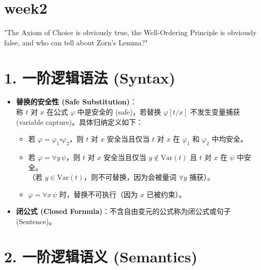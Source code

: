\documentclass[12pt, a4paper]{article}
\begin{document}
\section*{week2}
\raggedright{"The Axiom of Choice is obviously true, the Well-Ordering Principle is obviously false, and who can tell about Zorn's Lemma?"} \\

\raggedright{}
\section*{1. 一阶逻辑语法 (Syntax)}

\begin{itemize}
    \item \textbf{替换的安全性 (Safe Substitution)}：\\
    称 \(t\) 对 \(x\) 在公式 \(\varphi\) 中是安全的 (safe)，若替换 \(\varphi[t/x]\) 不发生变量捕获 (variable capture)。具体归纳定义如下：
    \begin{itemize}
        \item 若 \(\varphi = \varphi_1 \square \varphi_2\)，则 \(t\) 对 \(x\) 安全当且仅当 \(t\) 对 \(x\) 在 \(\varphi_1\) 和 \(\varphi_2\) 中均安全。
        \item 若 \(\varphi = \forall y \, \psi\)，则 \(t\) 对 \(x\) 安全当且仅当 \(y \notin \text{Var}(t)\) 且 \(t\) 对 \(x\) 在 \(\psi\) 中安全。\\
        （若 \(y \in \text{Var}(t)\)，则不可替换，因为会被量词 \(\forall y\) 捕获）。
        \item \(\varphi = \forall x \, \psi\) 时，替换不可执行（因为 \(x\) 已被约束）。
    \end{itemize}
    \item \textbf{闭公式 (Closed Formula)}：不含自由变元的公式称为闭公式或句子 (Sentence)。
\end{itemize}

\section*{2. 一阶逻辑语义 (Semantics)}
\end{document}
